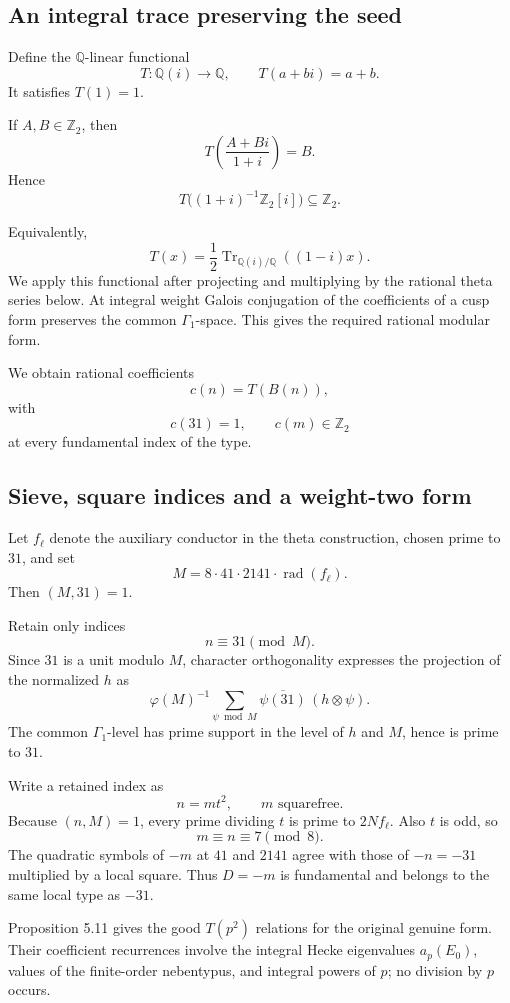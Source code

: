\documentclass[11pt]{article}
\begin{document}
\subsection{An integral trace preserving the seed}

Define the $\mathbb Q$-linear functional
\[
T:\mathbb Q(i)\longrightarrow\mathbb Q,
\qquad T(a+bi)=a+b.
\]
It satisfies $T(1)=1$.

If $A,B\in\mathbb Z_2$, then
\[
T\left(\frac{A+Bi}{1+i}\right)=B.
\]
Hence
\[
T\bigl((1+i)^{-1}\mathbb Z_2[i]\bigr)
\subseteq\mathbb Z_2.
\]

Equivalently,
\[
T(x)=\frac12
\operatorname{Tr}_{\mathbb Q(i)/\mathbb Q}
((1-i)x).
\]
We apply this functional after projecting and multiplying by the
rational theta series below. At integral weight Galois conjugation
of the coefficients of a cusp form preserves the common
$\Gamma_1$-space. This gives the required rational modular form.

We obtain rational coefficients
\[
c(n)=T(B(n)),
\]
with
\[
c(31)=1,\qquad
c(m)\in\mathbb Z_2
\]
at every fundamental index of the type.

\subsection{Sieve, square indices and a weight-two form}

Let $f_\ell$ denote the auxiliary conductor
in the theta construction, chosen prime
to $31$, and set
\[
M=8\cdot41\cdot2141\cdot\operatorname{rad}(f_\ell).
\]
Then $(M,31)=1$.

Retain only indices
\[
n\equiv31\pmod M.
\]
Since $31$ is a unit modulo $M$, character orthogonality expresses
the projection of the normalized $h$ as
\[
\varphi(M)^{-1}\sum_{\psi\bmod M}
\overline{\psi(31)}\, (h\otimes\psi).
\]
The common $\Gamma_1$-level has prime support in the level of $h$
and $M$, hence is prime to $31$.

Write a retained index as
\[
n=mt^2,\qquad m\text{ squarefree}.
\]
Because $(n,M)=1$, every prime dividing
$t$ is prime to $2Nf_\ell$.
Also $t$ is odd, so
\[
m\equiv n\equiv7\pmod8.
\]
The quadratic symbols of $-m$ at
$41$ and $2141$ agree with those of
$-n=-31$ multiplied by a local square.
Thus $D=-m$ is fundamental and belongs
to the same local type as $-31$.

Proposition 5.11 gives the good
$T(p^2)$ relations for the original
genuine form. Their coefficient
recurrences involve the integral Hecke
eigenvalues $a_p(E_0)$, values of the
finite-order nebentypus, and integral
powers of $p$; no division by $p$
occurs.
\end{document}

